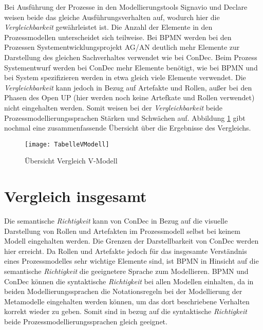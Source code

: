 Bei Ausführung der Prozesse in den Modellierungstools Signavio und Declare weisen beide das gleiche Ausführungsverhalten auf, wodurch hier die \textit{Vergleichbarkeit} gewährleistet ist. \newline
Die Anzahl der Elemente in den Prozessmodellen unterscheidet sich teilweise. Bei BPMN werden bei den Prozessen Systementwicklungsprojekt AG/AN deutlich mehr Elemente zur Darstellung des gleichen Sachverhaltes verwendet wie bei ConDec. Beim Prozess Systementwurf werden bei ConDec mehr Elemente benötigt, wie bei BPMN und bei System spezifizieren werden in etwa gleich viele Elemente verwendet.\newline
Die \textit{Vergleichbarkeit} kann jedoch in Bezug auf Artefakte und Rollen, außer bei den Phasen des Open UP (hier werden noch keine Artefkate und Rollen verwendet) nicht eingehalten werden.\newline
Somit weisen bei der \textit{Vergleichbarkeit} beide Prozessmodellierungssprachen Stärken und Schwächen auf. \newline
Abbildung \ref{fig:TabelleVModell} gibt nochmal eine zusammenfassende Übersicht über die Ergebnisse des Vergleichs. 


\begin{figure}[!htbp]
\begin{center}
  \texttt{[image: TabelleVModell]} %
  \caption{Übersicht Vergleich V-Modell}
  \label{fig:TabelleVModell}
\end{center}
\end{figure}


\section{Vergleich insgesamt}

Die semantische \textit{Richtigkeit} kann von ConDec in Bezug auf die visuelle Darstellung von Rollen und Artefakten im Prozessmodell selbst bei keinem Modell  eingehalten werden. Die Grenzen der Darstellbarkeit von ConDec  werden hier erreicht. Da Rollen und Artefakte jedoch für das insgesamte Verständnis eines Prozessmodelles sehr wichtige Elemente sind, ist BPMN in Hinsicht auf die semantische \textit{Richtigkeit} die geeignetere Sprache zum Modellieren.  \newline
BPMN und ConDec können die syntaktische \textit{Richtigkeit} bei allen Modellen einhalten, da in beiden Modellierungssprachen die Notationsregeln bei der Modellierung der Metamodelle eingehalten werden können, um das dort beschriebene Verhalten korrekt wieder zu geben. Somit sind in bezug auf die syntaktische \textit{Richtigkeit} beide Prozessmodellierungssprachen gleich geeignet.\newline

